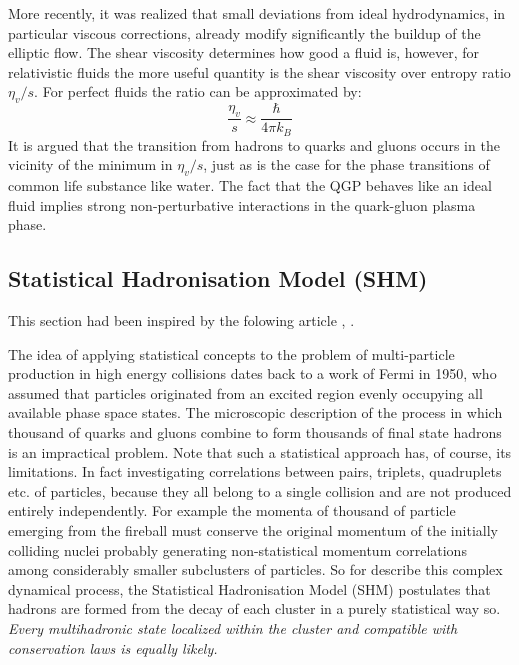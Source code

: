 \documentclass[12pt,a4paper]{book}
\begin{document}
	More recently, it was realized that small deviations from ideal hydrodynamics, in particular viscous corrections, already modify significantly the buildup of the elliptic flow. The shear viscosity determines how good a fluid is, however, for relativistic
	fluids the more useful quantity is the shear viscosity over entropy ratio $\eta_v/s$. For perfect	fluids the ratio can be approximated by:
	\begin{equation}
		\frac{\eta_v}{s} \approx \frac{\hbar}{4\pi k_B}
	\end{equation}
	It is argued that the transition from hadrons to quarks and gluons	occurs in the vicinity of the minimum in $\eta_v/s$, just as is the case for the phase transitions	of common life substance like water. The fact that the QGP behaves like an ideal fluid implies strong non-perturbative interactions in the quark-gluon plasma phase.
	
	
	
	
	\subsection{Statistical Hadronisation Model (SHM)}
	This section had been inspired by the folowing article \cite{becattini2009introductionstatisticalhadronizationmodel}, \cite{charm_hierarchy_in_the_statistical_hadronization_model} \cite{heinz2004conceptsheavyionphysics} \cite{amsdottorato9036}.
	
	The idea of applying statistical concepts to the problem of multi-particle production in high energy collisions dates back to a work of Fermi in 1950, who assumed that particles originated from an excited region evenly occupying all available phase space states. The microscopic description of the process in which thousand of quarks and gluons combine to form	thousands of final state hadrons is an impractical problem. Note that such a statistical approach has, of course, its limitations. In fact investigating correlations between pairs, triplets, quadruplets etc. of particles, because they all belong to a single collision and are not produced entirely independently. For example the momenta of thousand of particle emerging from the fireball must conserve the original momentum of the initially colliding nuclei probably generating non-statistical momentum correlations among considerably smaller subclusters of particles. So for describe this complex dynamical process, the Statistical Hadronisation Model (SHM) postulates that hadrons are formed from the decay of each cluster in a purely statistical way so. \textit{Every multihadronic state localized within the cluster and compatible with conservation laws is equally likely.}
	
\end{document}
